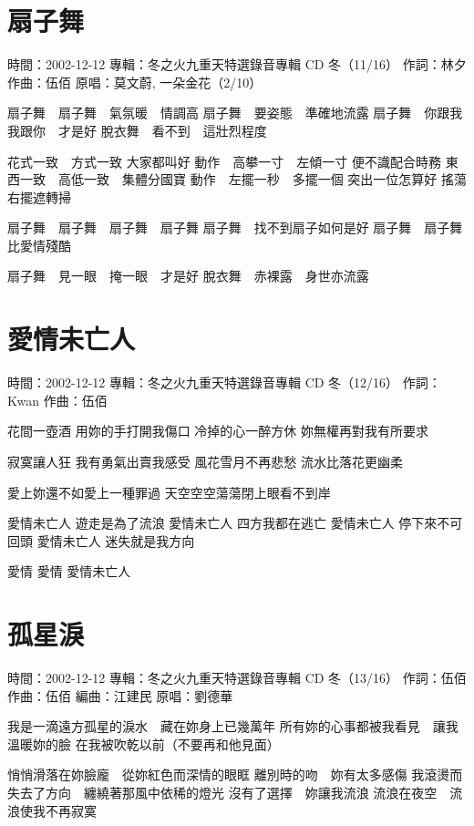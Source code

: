\documentclass[UTF8,a4paper,oneside,twocolumn,12pt]{ctexbook}
\newcommand{\infopair}[2]{\textbullet #1：#2}
\newcommand{\zc}[1][伍佰]{\infopair{作詞}{#1}}
\newcommand{\zq}[1][伍佰]{\infopair{作曲}{#1}}
\newcommand{\bq}[1][伍佰]{\infopair{編曲}{#1}}
\newcommand{\zj}[1]{\infopair{專輯}{#1}}
\newcommand{\yc}[1]{\infopair{原唱}{#1}}
\newcommand{\sj}[1]{\infopair{時間}{#1}}
\newenvironment{info}{\begin{flushleft}\kaishu
	}
	{\end{flushleft}\normalsize\yahei\par}
\newenvironment{lyric}{
	}
{}
\begin{document}
\section{扇子舞}
\begin{info}
	\sj{2002-12-12}
	\zj{冬之火九重天特選錄音專輯 CD 冬（11/16）}
	\zc[林夕]
	\zq
	\yc{莫文蔚, 一朵金花（2/10）}
\end{info}
\begin{lyric}
	扇子舞　扇子舞　氣氛暖　情調高
	扇子舞　要姿態　準確地流露
	扇子舞　你跟我　我跟你　才是好
	脫衣舞　看不到　這壯烈程度

	花式一致　方式一致 大家都叫好
	動作　高攀一寸　左傾一寸 便不識配合時務
	東西一致　高低一致　集體分國寶
	動作　左擺一秒　多擺一個 突出一位怎算好
	搖蕩右擺遮轉掃

	扇子舞　扇子舞　扇子舞　扇子舞
	扇子舞　找不到扇子如何是好
	扇子舞　扇子舞比愛情殘酷

	扇子舞　見一眼　掩一眼　才是好
	脫衣舞　赤裸露　身世亦流露
\end{lyric}

\section{愛情未亡人}
\begin{info}
	\sj{2002-12-12}
	\zj{冬之火九重天特選錄音專輯 CD 冬（12/16）}
	\zc[Kwan]
	\zq
\end{info}
\begin{lyric}
	花間一壺酒 用妳的手打開我傷口
	冷掉的心一醉方休 妳無權再對我有所要求

	寂寞讓人狂 我有勇氣出賣我感受
	風花雪月不再悲愁 流水比落花更幽柔

	愛上妳還不如愛上一種罪過
	天空空空蕩蕩閉上眼看不到岸

	愛情未亡人 遊走是為了流浪
	愛情未亡人 四方我都在逃亡
	愛情未亡人 停下來不可回頭
	愛情未亡人 迷失就是我方向

	愛情 愛情 愛情未亡人
\end{lyric}

\section{孤星淚}
\begin{info}
	\sj{2002-12-12}
	\zj{冬之火九重天特選錄音專輯 CD 冬（13/16）}
	\zc
	\zq
	\bq[江建民]
	\yc{劉德華}
\end{info}
\begin{lyric}
	我是一滴遠方孤星的淚水　藏在妳身上已幾萬年
	所有妳的心事都被我看見　讓我溫暖妳的臉
	在我被吹乾以前（不要再和他見面）

	悄悄滑落在妳臉龐　從妳紅色而深情的眼眶
	離別時的吻　妳有太多感傷
	我滾燙而失去了方向　纏繞著那風中依稀的燈光
	沒有了選擇　妳讓我流浪
	流浪在夜空　流浪使我不再寂寞
\end{lyric}
\end{document}
